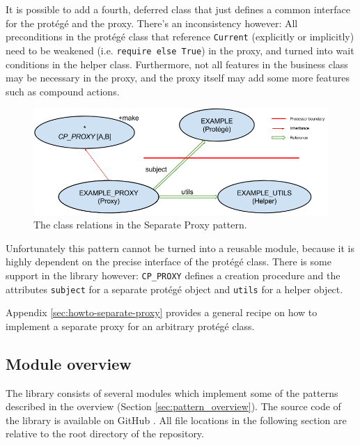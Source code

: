 It is possible to add a fourth, deferred class that just defines a common interface for the protégé and the proxy.
There's an inconsistency however: 
All preconditions in the protégé class that reference \lstinline!Current! (explicitly or implicitly) need to be weakened (i.e. \lstinline!require else True!) in the proxy, and turned into wait conditions in the helper class.
Furthermore, not all features in the business class may be necessary in the proxy, and the proxy itself may add some more features such as compound actions.

\begin{figure}[h]
\label{fig:separate-proxy}
\includegraphics[width=\textwidth]{resources/separate_proxy.png}
\caption{The class relations in the Separate Proxy pattern.}
\end{figure}

Unfortunately this pattern cannot be turned into a reusable module, because it is highly dependent on the precise interface of the protégé class.
There is some support in the library however: 
\lstinline!CP_PROXY! defines a creation procedure and the attributes \lstinline!subject! for a separate protégé object and \lstinline!utils! for a helper object.

Appendix \ref{sec:howto-separate-proxy} provides a general recipe on how to implement a separate proxy for an arbitrary protégé class.

\subsection {Module overview}
\label{sec:module-overview}
The library consists of several modules which implement some of the patterns described in the overview (Section \ref{sec:pattern_overview}).
The source code of the library is available on GitHub \cite{web:repository}.
All file locations in the following section are relative to the root directory of the repository.

